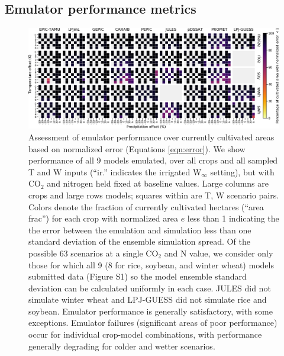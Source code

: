 \documentclass[gmd, manuscript]{copernicus} %
\begin{document}
\subsection{Emulator performance metrics}
\label{S:4.2}
\begin{figure}[ht]
\centering
    \includegraphics[width=16.3cm]{figures/error_grid_new.png}
    \caption{
    Assessment of emulator performance over currently cultivated areas based on normalized error (Equations \ref{eqn:error}). 
    We show performance of all 9 models emulated, over all crops and all sampled T and W inputs (``ir.'' indicates the irrigated W$_{\infty}$ setting), but with CO$_2$ and nitrogen held fixed at baseline values. 
    Large columns are crops and large rows models; squares within are T, W scenario pairs. 
    Colors denote the fraction of currently cultivated hectares (``area frac'') for each crop with normalized area $e$ less than 1 indicating the the error between the emulation and simulation less than one standard deviation of the ensemble simulation spread. 
    Of the possible 63 scenarios at a single CO$_2$ and N value, we consider only those for which all 9 (8 for rice, soybean, and winter wheat) models submitted data (Figure S1) so the model ensemble standard deviation can be calculated uniformly in each case. 
    JULES did not simulate winter wheat and LPJ-GUESS did not simulate rice and soybean. Emulator performance is generally satisfactory, with some exceptions. 
    Emulator failures (significant areas of poor performance) occur for individual crop-model combinations, with performance generally degrading for colder and wetter scenarios.
    }
   \label{fig:error_360}
\end{figure}
\end{document}
